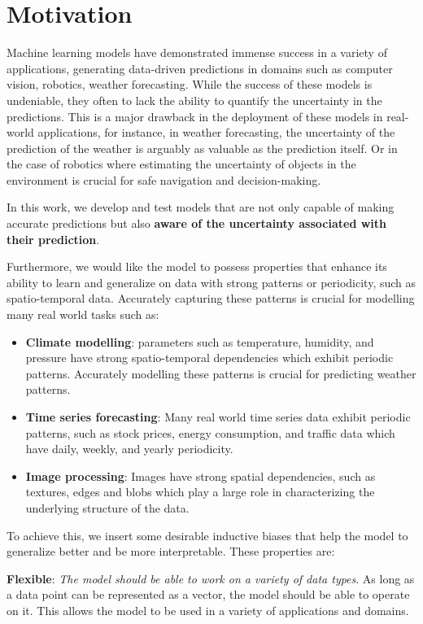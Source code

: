 \documentclass[../../main.tex]{subfiles}
\begin{document}
\section{Motivation}

Machine learning models have demonstrated immense success in a variety of applications, generating data-driven  predictions in domains such as computer vision, robotics, weather forecasting. While the success of these models is undeniable, they often to lack the ability to quantify the uncertainty in the predictions. This is a major drawback in the deployment of these models in real-world applications, for instance, in weather forecasting,  the uncertainty of the prediction of the weather is arguably as valuable as the prediction itself. Or in the case of robotics where estimating the uncertainty of objects in the environment is crucial for safe navigation and decision-making.

In this work, we develop and test models that are not only capable of making accurate predictions but also \textbf{aware of the uncertainty associated with their prediction}.

Furthermore, we would like the model to possess properties that enhance its ability to learn and generalize on data with strong patterns or periodicity, such as spatio-temporal data. Accurately capturing these patterns is crucial for modelling many real world tasks such as:

\begin{itemize}
	\item \textbf{Climate modelling}: parameters such as temperature, humidity, and pressure have strong spatio-temporal dependencies which exhibit periodic patterns. Accurately modelling these patterns is crucial for predicting weather patterns.
	\item \textbf{Time series forecasting}: Many real world time series data exhibit periodic patterns, such as stock prices, energy consumption, and traffic data which have daily, weekly, and yearly periodicity. 
	\item \textbf{Image processing}: Images have strong spatial dependencies, such as textures, edges and blobs which play a large role in characterizing the underlying structure of the data.
\end{itemize}


To achieve this, we insert some desirable inductive biases that help the model to generalize better and be more interpretable. These properties are:

\textbf{Flexible}: \emph{The model should be able to work on a variety of data types}. As long as a data point can be represented as a vector, the model should be able to operate on it. This allows the model to be used in a variety of applications and domains.
\end{document}
